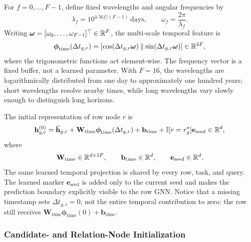 For \(f=0,\ldots,F-1\), define fixed wavelengths and angular frequencies
by
\begin{equation}
  \lambda_f
  =
  10^{4.56f/(F-1)}\ \text{days},
  \qquad
  \omega_f
  =
  \frac{2\pi}{\lambda_f}.
\label{eq:method:temporal-frequencies}
\end{equation}
Writing
\(\boldsymbol\omega=[\omega_0,\ldots,\omega_{F-1}]^\top\in\mathbb{R}^F\), the
multi-scale temporal feature is
\begin{equation}
  \boldsymbol\phi_{\mathrm{time}}(\Delta t_{g,r})
  =
  [
    \cos(\Delta t_{g,r}\boldsymbol\omega)
    \mathbin{\Vert}
    \sin(\Delta t_{g,r}\boldsymbol\omega)
  ]
  \in\mathbb{R}^{2F},
\label{eq:method:time-feature}
\end{equation}
where the trigonometric functions act element-wise. The frequency vector is
a fixed buffer, not a learned parameter. With \(F=16\), the wavelengths are
logarithmically distributed from one day to approximately one hundred
years; short wavelengths resolve nearby times, while long wavelengths vary
slowly enough to distinguish long horizons.

The initial representation of row node \(r\) is
\begin{equation}
  \mathbf h_{g,r}^{(0)}
  =
  \overline{\mathbf h}_{g,r}
  +\mathbf W_{\mathrm{time}}
   \boldsymbol\phi_{\mathrm{time}}(\Delta t_{g,r})
  +\mathbf b_{\mathrm{time}}
  +\mathbb{I}[r=r_g^\star]\mathbf e_{\mathrm{seed}}
  \in\mathbb{R}^d,
\label{eq:method:row-initialization}
\end{equation}
where
\begin{equation}
  \mathbf W_{\mathrm{time}}\in\mathbb{R}^{d\times2F},
  \qquad
  \mathbf b_{\mathrm{time}}\in\mathbb{R}^d,
  \qquad
  \mathbf e_{\mathrm{seed}}\in\mathbb{R}^d.
\label{eq:method:time-seed-parameter-domains}
\end{equation}
The same learned temporal projection is shared by every row, task, and
query. The learned marker \(\mathbf e_{\mathrm{seed}}\) is added only to the
current seed and makes the prediction boundary explicitly visible to the
row GNN. Notice that a missing timestamp sets \(\Delta t_{g,r}=0\), not the
entire temporal contribution to zero: the row still receives
\(\mathbf W_{\mathrm{time}}\boldsymbol\phi_{\mathrm{time}}(0)
+\mathbf b_{\mathrm{time}}\).

\subsubsection{Candidate- and Relation-Node Initialization}
\label{sec:method:candidate-relation-initialization}

